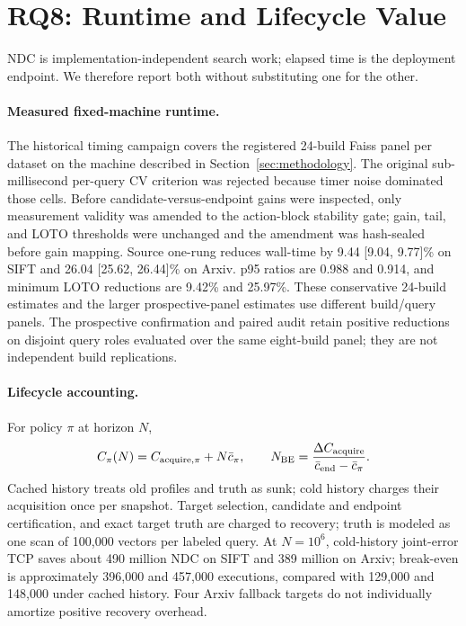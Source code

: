 \section{RQ8: Runtime and Lifecycle Value}
\label{sec:economics}

NDC is implementation-independent search work; elapsed time is the deployment endpoint. We therefore report both without substituting one for the other.

\paragraph{Measured fixed-machine runtime.}
The historical timing campaign covers the registered 24-build Faiss panel per dataset on the machine described in Section~\ref{sec:methodology}. The original sub-millisecond per-query CV criterion was rejected because timer noise dominated those cells. Before candidate-versus-endpoint gains were inspected, only measurement validity was amended to the action-block stability gate; gain, tail, and LOTO thresholds were unchanged and the amendment was hash-sealed before gain mapping. Source one-rung reduces wall-time by 9.44 [9.04, 9.77]\% on SIFT and 26.04 [25.62, 26.44]\% on Arxiv. p95 ratios are 0.988 and 0.914, and minimum LOTO reductions are 9.42\% and 25.97\%. These conservative 24-build estimates and the larger prospective-panel estimates use different build/query panels. The prospective confirmation and paired audit retain positive reductions on disjoint query roles evaluated over the same eight-build panel; they are not independent build replications.

\paragraph{Lifecycle accounting.}
For policy $\pi$ at horizon $N$,
\begin{equation}
 C_\pi(N)=C_{{\rm acquire},\pi}+N\bar c_\pi,
 \qquad N_{\rm BE}=\frac{\Delta C_{\rm acquire}}{\bar c_{\rm end}-\bar c_\pi}.
 \label{eq:breakeven}
\end{equation}
Cached history treats old profiles and truth as sunk; cold history charges their acquisition once per snapshot. Target selection, candidate and endpoint certification, and exact target truth are charged to recovery; truth is modeled as one scan of 100,000 vectors per labeled query. At $N=10^6$, cold-history joint-error TCP saves about 490 million NDC on SIFT and 389 million on Arxiv; break-even is approximately 396,000 and 457,000 executions, compared with 129,000 and 148,000 under cached history. Four Arxiv fallback targets do not individually amortize positive recovery overhead.

